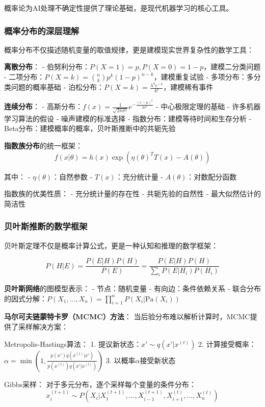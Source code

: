 概率论为AI处理不确定性提供了理论基础，是现代机器学习的核心工具。

\subsubsection{概率分布的深层理解}

概率分布不仅描述随机变量的取值规律，更是建模现实世界复杂性的数学工具：

\textbf{离散分布}：
- 伯努利分布：$P(X=1) = p, P(X=0) = 1-p$，建模二分类问题
- 二项分布：$P(X=k) = \binom{n}{k}p^k(1-p)^{n-k}$，建模重复试验
- 多项分布：多分类问题的概率基础
- 泊松分布：$P(X=k) = \frac{\lambda^k e^{-\lambda}}{k!}$，建模稀有事件

\textbf{连续分布}：
- 高斯分布：$f(x) = \frac{1}{\sqrt{2\pi\sigma^2}}e^{-\frac{(x-\mu)^2}{2\sigma^2}}$
  - 中心极限定理的基础
  - 许多机器学习算法的假设
  - 噪声建模的标准选择
- 指数分布：建模等待时间和生存分析
- Beta分布：建模概率的概率，贝叶斯推断中的共轭先验

\textbf{指数族分布}的统一框架：
$$f(x|\theta) = h(x)\exp(\eta(\theta)^T T(x) - A(\theta))$$

其中：
- $\eta(\theta)$：自然参数
- $T(x)$：充分统计量
- $A(\theta)$：对数配分函数

指数族的优美性质：
- 充分统计量的存在性
- 共轭先验的自然性
- 最大似然估计的简洁性

\subsubsection{贝叶斯推断的数学框架}

贝叶斯定理不仅是概率计算公式，更是一种认知和推理的数学框架：

$$P(H|E) = \frac{P(E|H)P(H)}{P(E)} = \frac{P(E|H)P(H)}{\sum_i P(E|H_i)P(H_i)}$$

\textbf{贝叶斯网络}的图模型表示：
- 节点：随机变量
- 有向边：条件依赖关系
- 联合分布的因式分解：$P(X_1, \ldots, X_n) = \prod_{i=1}^n P(X_i|\text{Pa}(X_i))$

\textbf{马尔可夫链蒙特卡罗（MCMC）方法}：
当后验分布难以解析计算时，MCMC提供了采样解决方案：

Metropolis-Hastings算法：
1. 提议新状态：$x' \sim q(x'|x^{(t)})$
2. 计算接受概率：$\alpha = \min\left(1, \frac{p(x')q(x^{(t)}|x')}{p(x^{(t)})q(x'|x^{(t)})}\right)$
3. 以概率$\alpha$接受新状态

Gibbs采样：
对于多元分布，逐个采样每个变量的条件分布：
$$x_i^{(t+1)} \sim P(X_i|X_1^{(t+1)}, \ldots, X_{i-1}^{(t+1)}, X_{i+1}^{(t)}, \ldots, X_n^{(t)})$$

